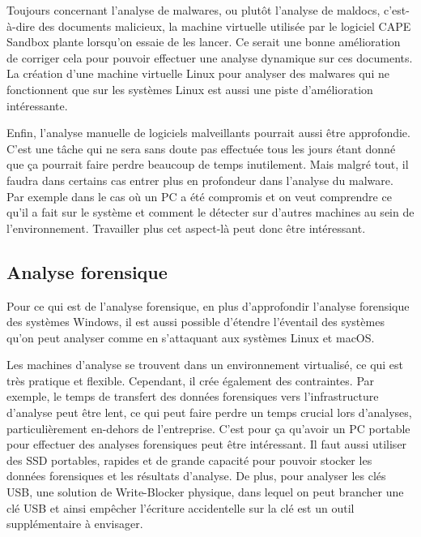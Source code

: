 Toujours concernant l'analyse de malwares, ou plutôt l'analyse de maldocs, c'est-à-dire des documents malicieux, la machine virtuelle utilisée par le logiciel CAPE Sandbox plante lorsqu'on essaie de les lancer. Ce serait une bonne amélioration de corriger cela pour pouvoir effectuer une analyse dynamique sur ces documents. La création d'une machine virtuelle Linux pour analyser des malwares qui ne fonctionnent que sur les systèmes Linux est aussi une piste d'amélioration intéressante.

Enfin, l'analyse manuelle de logiciels malveillants pourrait aussi être approfondie. C'est une tâche qui ne sera sans doute pas effectuée tous les jours étant donné que ça pourrait faire perdre beaucoup de temps inutilement. Mais malgré tout, il faudra dans certains cas entrer plus en profondeur dans l'analyse du malware. Par exemple dans le cas où un PC a été compromis et on veut comprendre ce qu'il a fait sur le système et comment le détecter sur d'autres machines au sein de l'environnement. Travailler plus cet aspect-là peut donc être intéressant.



\subsection{Analyse forensique}

Pour ce qui est de l'analyse forensique, en plus d'approfondir l'analyse forensique des systèmes Windows, il est aussi possible d'étendre l'éventail des systèmes qu'on peut analyser comme en s'attaquant aux systèmes Linux et macOS.

Les machines d'analyse se trouvent dans un environnement virtualisé, ce qui est très pratique et flexible. Cependant, il crée également des contraintes. Par exemple, le temps de transfert des données forensiques vers l'infrastructure d'analyse peut être lent, ce qui peut faire perdre un temps crucial lors d'analyses, particulièrement en-dehors de l'entreprise. C'est pour ça qu'avoir un PC portable pour effectuer des analyses forensiques peut être intéressant. Il faut aussi utiliser des SSD portables, rapides et de grande capacité pour pouvoir stocker les données forensiques et les résultats d'analyse. De plus, pour analyser les clés USB, une solution de Write-Blocker physique, dans lequel on peut brancher une clé USB et ainsi empêcher l'écriture accidentelle sur la clé est un outil supplémentaire à envisager.





